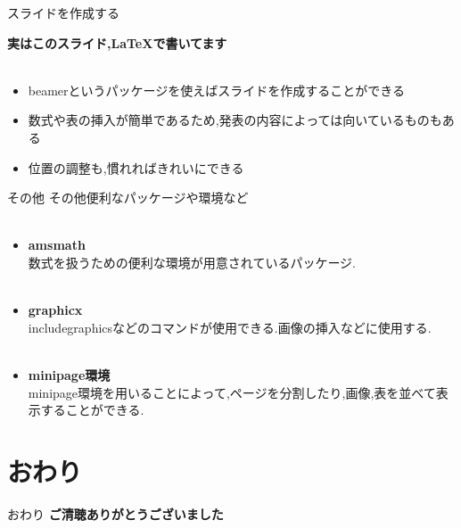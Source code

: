 \documentclass[dvipdfmx]{beamer}
\begin{document}
  \begin{frame}{スライドを作成する}
    \begin{center}
      \Large\bf
      実はこのスライド,\LaTeX で書いてます~\\~\\
    \end{center}
    \begin{itemize}
      \item beamerというパッケージを使えばスライドを作成することができる
      \item 数式や表の挿入が簡単であるため,発表の内容によっては向いているものもある
      \item 位置の調整も,慣れればきれいにできる
    \end{itemize}
  \end{frame}
  \begin{frame}{その他}
    その他便利なパッケージや環境など\\~\\
    \scriptsize
    \begin{itemize}
      \item {\normalsize\bf amsmath}\\
            数式を扱うための便利な環境が用意されているパッケージ.\\~\\
      \item {\normalsize\bf graphicx}\\
            includegraphicsなどのコマンドが使用できる.画像の挿入などに使用する.\\~\\
      \item {\normalsize\bf minipage環境}\\
            minipage環境を用いることによって,ページを分割したり,画像,表を並べて表示することができる.
    \end{itemize}
  \end{frame}
  \section{おわり}
  \begin{frame}{おわり}
    \centering\Large\bf
    ご清聴ありがとうございました
  \end{frame}
\end{document}
